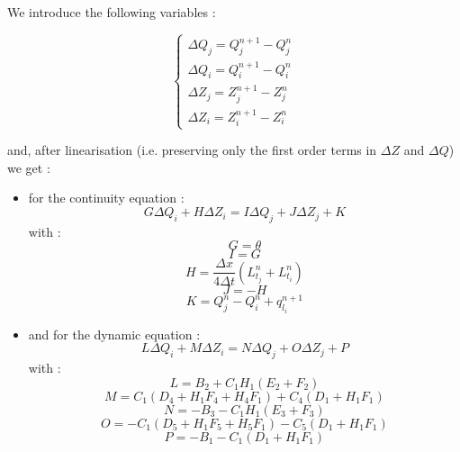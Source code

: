 We introduce the following variables :

\begin{equation}
 \left \lbrace
  \begin{array}{l}
    \Delta Q_j = Q_{j}^{n+1} - Q_{j}^n \\
    \Delta Q_i = Q_{i}^{n+1} - Q_{i}^n \\
    \Delta Z_j = Z_{j}^{n+1} - Z_{j}^n \\
    \Delta Z_i = Z_{i}^{n+1} - Z_{i}^n
  \end{array}
 \right.
\end{equation}

and, after linearisation (i.e. preserving only the first order terms in $\Delta Z$ and $\Delta Q$) we get :

\begin{itemize}
 \item for the continuity equation :
  \begin{equation}
   \label{CONT}
   \boxed{
     G \Delta Q_i + H \Delta Z_i = I \Delta Q_j + J \Delta Z_j + K
   }
  \end{equation}
  with :
  \begin{equation}
   \label{CONT1}
   G = \theta
  \end{equation}
  \begin{equation}
    \label{CONT2}
   I = G
  \end{equation}
  \begin{equation}
    \label{CONT3}
   H = \frac{\Delta x}{4 \Delta t} ( L_{t_j}^n + L_{t_i}^n )
  \end{equation}
  \begin{equation}
    \label{CONT4}
   J = -H
  \end{equation}
   \begin{equation}
   \label{CONT5}
   K = Q_{j}^n - Q_{i}^n + q_{l_i}^{n+1}
  \end{equation}

 \item and for the dynamic equation :
  \begin{equation}
   \label{DYN}
   \boxed{
     L \Delta Q_i + M \Delta Z_i = N \Delta Q_j + O \Delta Z_j + P
   }
  \end{equation}
  with :
  \begin{equation}
    \label{DYN1}
   L = B_2 + C_1 H_1 ( E_2 + F_2 )
  \end{equation}
  \begin{equation}
    \label{DYN2}
   M = C_1 ( D_4 + H_1 F_4 + H_4 F_1 ) + C_4 ( D_1 + H_1 F_1 )
  \end{equation}
   \begin{equation}
    \label{DYN3}
   N = -B_3 - C_1 H_1 ( E_3 + F_3 )
  \end{equation}
  \begin{equation}
     \label{DYN4}
   O = -C_1 ( D_5 + H_1 F_5 + H_5 F_1 ) - C_5 ( D_1 + H_1 F_1 )
  \end{equation}
  \begin{equation}
   \label{DYN5}
   P = -B_1 - C_1 ( D_1 + H_1 F_1 )
  \end{equation}
\end{itemize}

